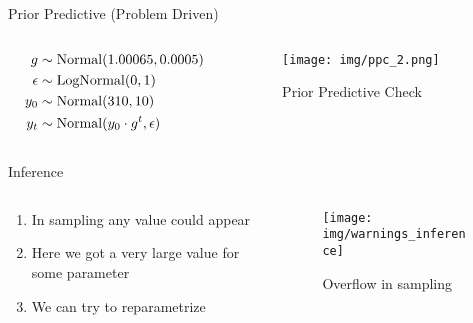 \documentclass{beamer}
\begin{document}
\begin{frame}{Prior Predictive (Problem Driven)}
    \begin{columns}
    \begin{column}{0.5\linewidth}
    \begin{align*}
        g &\sim \operatorname{Normal}(1.00065, 0.0005)\\
        {\epsilon} &\sim \operatorname{LogNormal}(0, 1)\\
        y_0 &\sim \operatorname{Normal}(310, 10)\\
        y_t &\sim \operatorname{Normal}(y_0 \cdot g^t, {\epsilon})
    \end{align*}
    \end{column}
    \begin{column}{0.5\linewidth}
    \begin{figure}
        \centering
        \texttt{[image: img/ppc\_2.png]}
        \caption{Prior Predictive Check}
    \end{figure}
    \end{column}
\end{columns}
\end{frame}
\begin{frame}{Inference}
    \begin{columns}
    \begin{column}{0.5\linewidth}
    \begin{enumerate}
        \item In sampling any value could appear
        \item Here we got a very large value for some parameter
        \item We can try to reparametrize
    \end{enumerate}
    \end{column}
    \begin{column}{0.5\linewidth}
    \begin{figure}
        \centering
        \texttt{[image: img/warnings\_inference]}
        \caption{Overflow in sampling}
    \end{figure}
    \end{column}
    \end{columns}
\end{frame}
\end{document}
